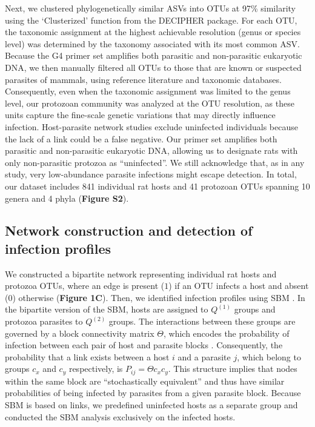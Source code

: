 \documentclass[oneside, a4paper, onecolumn, 11pt]{article}
\begin{document}
Next, we clustered phylogenetically similar ASVs into OTUs at 97\% similarity using the `Clusterized' function from the DECIPHER package. For each OTU, the taxonomic assignment at the highest achievable resolution (genus or species level) was determined by the taxonomy associated with its most common ASV. Because the G4 primer set amplifies both parasitic and non-parasitic eukaryotic DNA, we then manually filtered all OTUs to those that are known or suspected parasites of mammals, using reference literature and taxonomic databases. Consequently, even when the taxonomic assignment was limited to the genus level, our protozoan community was analyzed at the OTU resolution, as these units capture the fine-scale genetic variations that may directly influence infection. Host-parasite network studies exclude uninfected individuals because the lack of a link could be a false negative. Our primer set amplifies both parasitic and non-parasitic eukaryotic DNA, allowing us to designate rats with only non-parasitic protozoa as ``uninfected''. We still acknowledge that, as in any study, very low-abundance parasite infections might escape detection. In total, our dataset includes 841 individual rat hosts and 41 protozoan OTUs spanning 10 genera and 4 phyla (\textbf{Figure S2}). 

\subsection*{Network construction and detection of infection profiles}
We constructed a bipartite network representing individual rat hosts and protozoa OTUs, where an edge is present ($1$) if an OTU infects a host and absent ($0$) otherwise (\textbf{Figure 1C}). Then, we identified infection profiles using SBM \citep{Leger2016-ab}. In the bipartite version of the SBM, hosts are assigned to $Q^{(1)}$ groups and protozoa parasites to $Q^{(2)}$ groups. The interactions between these groups are governed by a block connectivity matrix $\Theta$, which encodes the probability of infection between each pair of host and parasite blocks \citep{Leger2016-ab}. Consequently, the probability that a link exists between a host $i$ and a parasite $j$, which belong to groups $c_x$ and $c_y$ respectively, is $P_{ij} = \Theta{c_x c_y}$. This structure implies that nodes within the same block are ``stochastically equivalent'' and thus have similar probabilities of being infected by parasites from a given parasite block. Because SBM is based on links, we predefined uninfected hosts as a separate group and conducted the SBM analysis exclusively on the infected hosts.
\end{document}
